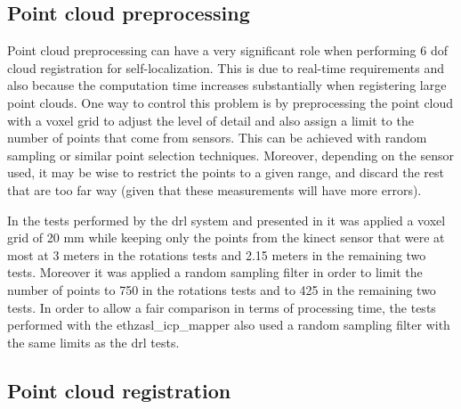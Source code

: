 \subsection{Point cloud preprocessing}

Point cloud preprocessing can have a very significant role when performing 6 \gls{dof} cloud registration for self-localization. This is due to real-time requirements and also because the computation time increases substantially when registering large point clouds. One way to control this problem is by preprocessing the point cloud with a voxel grid to adjust the level of detail and also assign a limit to the number of points that come from sensors. This can be achieved with random sampling or similar point selection techniques. Moreover, depending on the sensor used, it may be wise to restrict the points to a given range, and discard the rest that are too far way (given that these measurements will have more errors).

In the tests performed by the \gls{drl} system and presented in  it was applied a voxel grid of 20 mm while keeping only the points from the kinect sensor that were at most at 3 meters in the rotations tests and 2.15 meters in the remaining two tests. Moreover it was applied a random sampling filter in order to limit the number of points to 750 in the rotations tests and to 425 in the remaining two tests. In order to allow a fair comparison in terms of processing time, the tests performed with the ethzasl\_icp\_mapper also used a random sampling filter with the same limits as the \gls{drl} tests.




\subsection{Point cloud registration}

